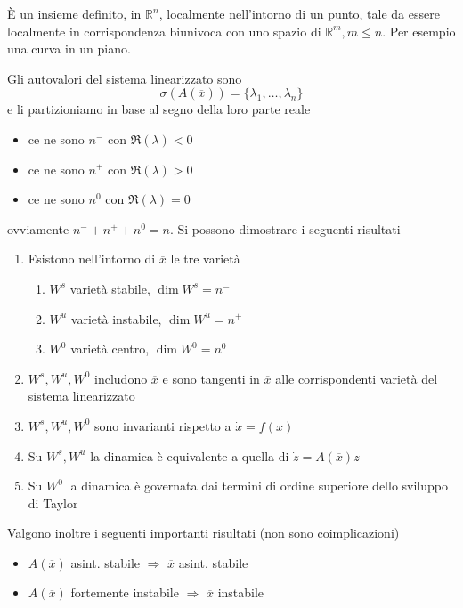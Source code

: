 \documentclass[10pt,a4paper]{book}
\begin{document}
È un insieme definito, in $\mathbb{R}^n$, localmente nell'intorno di un punto, tale da essere localmente in corrispondenza biunivoca con uno spazio di $\mathbb{R}^m ,m\leqslant n$. Per esempio una curva in un piano.

Gli autovalori del sistema linearizzato sono
\begin{equation*}
	\sigma (A(\overline{x})) =\{\lambda _1 ,\dotsc ,\lambda _n\}
\end{equation*}
e li partizioniamo in base al segno della loro parte reale
\begin{itemize}
	\item ce ne sono $n^{-}$ con $\Re(\lambda) < 0$
	\item ce ne sono $n^{+}$ con $\Re(\lambda)  >0$
	\item ce ne sono $n^0$ con $\Re(\lambda) =0$
\end{itemize}

ovviamente $n^{-} +n^{+} +n^0 =n$. Si possono dimostrare i seguenti risultati
\begin{enumerate}
	\item Esistono nell'intorno di $\overline{x}$ le tre varietà
	      \begin{enumerate}
	      	\item $W^s$ varietà stabile, $\dim W^s =n^{-}$
	      	\item $W^u$ varietà instabile, $\dim W^u =n^{+}$
	      	\item $W^0$ varietà centro, $\dim W^0 =n^0$
	      \end{enumerate}
	\item $W^s ,W^u ,W^0$ includono $\overline{x}$ e sono tangenti in $\overline{x}$ alle corrispondenti varietà del sistema linearizzato
	\item $W^s ,W^u ,W^0$ sono invarianti rispetto a $\dot{x} =f(x)$
	\item Su $W^s ,W^u$ la dinamica è equivalente a quella di $\dot{z} =A(\overline{x}) z$
	\item Su $W^0$ la dinamica è governata dai termini di ordine superiore dello sviluppo di Taylor
\end{enumerate}

Valgono inoltre i seguenti importanti risultati (non sono coimplicazioni)
\begin{itemize}
	\item $A(\overline{x})$ asint. stabile $\Rightarrow $ $\overline{x}$ asint. stabile
	\item $A(\overline{x})$ fortemente instabile $\Rightarrow $ $\overline{x}$ instabile
\end{itemize}
\end{document}
